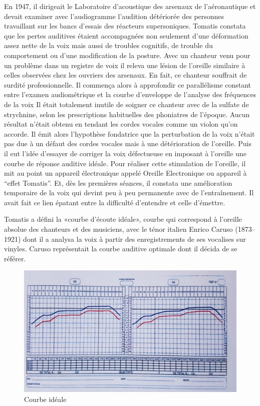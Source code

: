 En 1947, il dirigeait le Laboratoire d'acoustique
des arsenaux de l'aéronautique et devait examiner avec l'audiogramme l'audition détériorée
des personnes travaillant sur les bancs d'essais des réacteurs supersoniques. Tomatis constata que les pertes auditives étaient accompagnées non seulement  d'une
déformation assez nette de la voix mais aussi de troubles cognitifs, de trouble du comportement ou d'une modification de la posture. Avec
un chanteur venu pour un problème dans un registre de voix il releva une lésion de l'oreille similaire
à celles observées chez les ouvriers des arsenaux. En fait, ce chanteur
souffrait de surdité professionnelle. Il commença alors à approfondir
ce parallélisme constant entre l'examen audiométrique et la courbe
d'enveloppe de l'analyse des fréquences de la voix Il était totalement
inutile de soigner ce chanteur avec de la sulfate de
strychnine, selon les prescriptions habituelles des phoniatres de
l'époque. Aucun résultat n'était obtenu en tendant les cordes vocales
comme un violon qu'on accorde. Il émit alors l'hypothèse fondatrice
que la perturbation de la voix n'était pas due à un défaut des cordes
vocales mais à une détérioration de l'oreille. Puis il eut l'idée
d'essayer de corriger la voix défectueuse en imposant à l'oreille
une courbe de réponse auditive idéale. Pour réaliser cette stimulation
de l'oreille, il mit au point un appareil électronique appelé Oreille
Electronique ou appareil à ``effet Tomatis''. Et, dès les premières
séances, il constata une amélioration temporaire de la voix qui devint
peu à peu permanente avec de l'entraînement. Il avait fait ce lien épatant entre la difficulté d'entendre et celle d'émettre.

Tomatis a défini la «courbe d'écoute idéale», courbe qui correspond à l'oreille absolue
des chanteurs et des musiciens,  avec  le ténor italien Enrico
Caruso (1873--1921) dont il a analysa la voix à partir des enregistrements
de ses vocalises sur vinyles. Caruso représentait la courbe auditive
optimale dont il décida de se référer. 

\begin{figure}
	\centering
	\includegraphics[width=0.7\linewidth]{images/courbeideale.jpg}
	\caption{Courbe idéale}
	\label{fig:courbeideale}
\end{figure}


